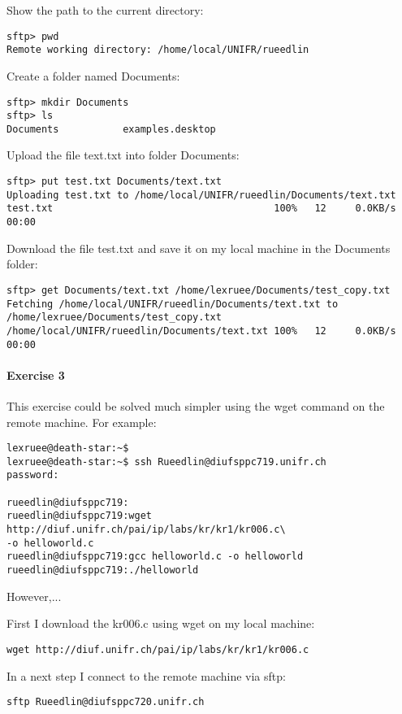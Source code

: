 \documentclass[12pt]{article}
\begin{document}
Show the path to the current directory:
\begin{lstlisting}
sftp> pwd
Remote working directory: /home/local/UNIFR/rueedlin
\end{lstlisting}

Create a folder named Documents:
\begin{lstlisting}
sftp> mkdir Documents
sftp> ls
Documents           examples.desktop
\end{lstlisting}

Upload the file text.txt into folder Documents:
\begin{lstlisting}
sftp> put test.txt Documents/text.txt
Uploading test.txt to /home/local/UNIFR/rueedlin/Documents/text.txt
test.txt                                      100%   12     0.0KB/s   00:00 
\end{lstlisting}

Download the file test.txt and save it on my local machine in the Documents folder:
\begin{lstlisting}
sftp> get Documents/text.txt /home/lexruee/Documents/test_copy.txt
Fetching /home/local/UNIFR/rueedlin/Documents/text.txt to 
/home/lexruee/Documents/test_copy.txt
/home/local/UNIFR/rueedlin/Documents/text.txt 100%   12     0.0KB/s   00:00 
\end{lstlisting}

\paragraph{Exercise 3}
This exercise could be solved much simpler using the wget command on the remote machine.
For example:
\begin{lstlisting}
lexruee@death-star:~$ 
lexruee@death-star:~$ ssh Rueedlin@diufsppc719.unifr.ch
password:

rueedlin@diufsppc719:
rueedlin@diufsppc719:wget http://diuf.unifr.ch/pai/ip/labs/kr/kr1/kr006.c\  
-o helloworld.c
rueedlin@diufsppc719:gcc helloworld.c -o helloworld
rueedlin@diufsppc719:./helloworld
\end{lstlisting}

However,...

First I download the kr006.c using wget on my local machine:
\begin{lstlisting}
wget http://diuf.unifr.ch/pai/ip/labs/kr/kr1/kr006.c
\end{lstlisting}

In a next step I connect to the remote machine via sftp:
\begin{lstlisting}
sftp Rueedlin@diufsppc720.unifr.ch
\end{lstlisting}
\end{document}
